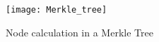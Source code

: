 \begin{figure}[H]
    \centering
    \texttt{[image: Merkle\_tree]}
    \caption{Node calculation in a Merkle Tree~\cite{smartproperty}}
    \label{fig:Merkletree}
\end{figure}
